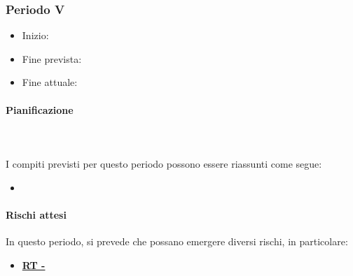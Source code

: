 \subsubsection{Periodo V}

\begin{itemize}
    \item Inizio:
    \item Fine prevista:
    \item Fine attuale:
\end{itemize}
\paragraph{Pianificazione} \hspace{1cm}
\\ \hspace{1cm} \\

I compiti previsti per questo periodo possono essere riassunti come segue:  
\begin{itemize}
    \item 
\end{itemize}

\paragraph{Rischi attesi}  
In questo periodo, si prevede che possano emergere diversi rischi, in particolare:

\begin{itemize}
    \item \textbf{\hyperlink{RT}{RT - }}
\end{itemize}


